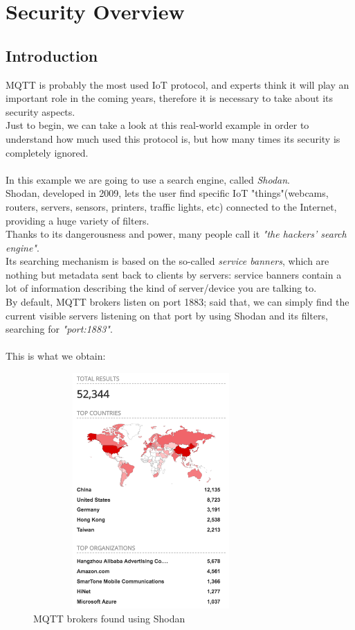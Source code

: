 \documentclass[12pt]{report}
\begin{document}
{\chapter{Security Overview}

\section{Introduction}
\bigskip
MQTT is probably the most used IoT protocol, and experts think it will play an important role in the coming years, therefore it is necessary to take about its security aspects.\\
Just to begin, we can take a look at this real-world example in order to understand how much used this protocol is, but how many times its security is completely ignored.\\\\
In this example we are going to use a search engine, called \emph{Shodan}.\\
Shodan, developed in 2009, lets the user find specific IoT "things"(webcams, routers, servers, sensors, printers, traffic lights, etc)  connected to the Internet, providing a huge variety of filters.\\

Thanks to its dangerousness and power, many people call it \emph{"the hackers' search engine"}.\\
Its searching mechanism is based on the so-called \emph{service banners}, which are nothing but metadata sent back to clients by servers: service banners contain a lot of information describing the kind of server/device you are talking to.\\

By default, MQTT brokers listen on port 1883; said that, we can simply find the current visible servers listening on that port by using Shodan and its filters, searching for \emph{"port:1883"}.\\\\
This is what we obtain:\\

\begin{figure}[H]
\includegraphics[width=9cm,height=9cm,keepaspectratio]{shodan_numdevices}
\centering
\caption{MQTT brokers found using Shodan}
\end{figure}\

}
\end{document}
